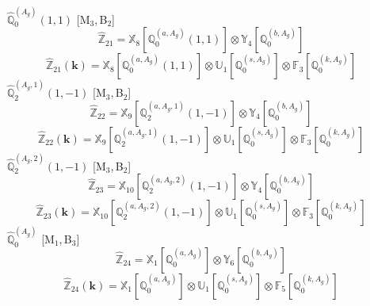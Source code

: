 \documentclass[fleqn,10pt,landscape]{article}
\begin{document}
\begin{itemize}
\vspace{4mm}
\noindent {} $\,\,\,\hat{\mathbb{Q}}_{0}^{(A_{g})}(1,1)$ [M$_{3}$,\,B$_{2}$]
\begin{dmath*}
\hat{\mathbb{Z}}_{21}=\mathbb{X}_{8}[\mathbb{Q}_{0}^{(a,A_{g})}(1,1)] \otimes\mathbb{Y}_{4}[\mathbb{Q}_{0}^{(b,A_{g})}]
\end{dmath*}
\begin{dmath*}
\hat{\mathbb{Z}}_{21}(\bm{k})=\mathbb{X}_{8}[\mathbb{Q}_{0}^{(a,A_{g})}(1,1)] \otimes\mathbb{U}_{1}[\mathbb{Q}_{0}^{(s,A_{g})}] \otimes\mathbb{F}_{3}[\mathbb{Q}_{0}^{(k,A_{g})}]
\end{dmath*}
\vspace{4mm}
\noindent {} $\,\,\,\hat{\mathbb{Q}}_{2}^{(A_{g},1)}(1,-1)$ [M$_{3}$,\,B$_{2}$]
\begin{dmath*}
\hat{\mathbb{Z}}_{22}=\mathbb{X}_{9}[\mathbb{Q}_{2}^{(a,A_{g},1)}(1,-1)] \otimes\mathbb{Y}_{4}[\mathbb{Q}_{0}^{(b,A_{g})}]
\end{dmath*}
\begin{dmath*}
\hat{\mathbb{Z}}_{22}(\bm{k})=\mathbb{X}_{9}[\mathbb{Q}_{2}^{(a,A_{g},1)}(1,-1)] \otimes\mathbb{U}_{1}[\mathbb{Q}_{0}^{(s,A_{g})}] \otimes\mathbb{F}_{3}[\mathbb{Q}_{0}^{(k,A_{g})}]
\end{dmath*}
\vspace{4mm}
\noindent {} $\,\,\,\hat{\mathbb{Q}}_{2}^{(A_{g},2)}(1,-1)$ [M$_{3}$,\,B$_{2}$]
\begin{dmath*}
\hat{\mathbb{Z}}_{23}=\mathbb{X}_{10}[\mathbb{Q}_{2}^{(a,A_{g},2)}(1,-1)] \otimes\mathbb{Y}_{4}[\mathbb{Q}_{0}^{(b,A_{g})}]
\end{dmath*}
\begin{dmath*}
\hat{\mathbb{Z}}_{23}(\bm{k})=\mathbb{X}_{10}[\mathbb{Q}_{2}^{(a,A_{g},2)}(1,-1)] \otimes\mathbb{U}_{1}[\mathbb{Q}_{0}^{(s,A_{g})}] \otimes\mathbb{F}_{3}[\mathbb{Q}_{0}^{(k,A_{g})}]
\end{dmath*}
\vspace{4mm}
\noindent {} $\,\,\,\hat{\mathbb{Q}}_{0}^{(A_{g})}$ [M$_{1}$,\,B$_{3}$]
\begin{dmath*}
\hat{\mathbb{Z}}_{24}=\mathbb{X}_{1}[\mathbb{Q}_{0}^{(a,A_{g})}] \otimes\mathbb{Y}_{6}[\mathbb{Q}_{0}^{(b,A_{g})}]
\end{dmath*}
\begin{dmath*}
\hat{\mathbb{Z}}_{24}(\bm{k})=\mathbb{X}_{1}[\mathbb{Q}_{0}^{(a,A_{g})}] \otimes\mathbb{U}_{1}[\mathbb{Q}_{0}^{(s,A_{g})}] \otimes\mathbb{F}_{5}[\mathbb{Q}_{0}^{(k,A_{g})}]
\end{dmath*}

\end{itemize}
\end{document}

